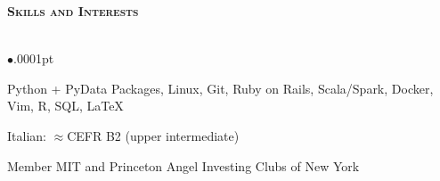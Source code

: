 \documentclass[11pt]{article}
\newcommand{\lineunder}{\vspace*{-8pt} \\ \hspace*{-18pt} \hrulefill \\}
\newcommand{\header}[1]{{\hspace*{-15pt}\vspace*{5pt} \Large \textsc{\textbf{#1}}} \vspace*{-6pt} \lineunder \vspace*{0pt} }
\newcommand{\employer}[4]{
	{\hspace*{-20pt} {\small{\textbf{\textsc{ #1}}}}
  \hfill \small{\emph{#2}}\\ ~\hspace*{-20pt} \small \emph{ #3 \hfill #4}}\\ }
\newenvironment{achievements}{\begin{list}{$\bullet$}{\topsep .0001pt \itemsep -2pt}}{\vspace*{5pt}\end{list} }
\begin{document}




\header{Skills and Interests}
	\vspace{-2pt}
	\begin{achievements}
		\item Python + PyData Packages, Linux, Git, Ruby on Rails, Scala/Spark, Docker, Vim, R, SQL, \LaTeX{}
		\item Italian: $\approx$CEFR B2 (upper intermediate)
		\item Member MIT and Princeton Angel Investing Clubs of New York
	\end{achievements}
\end{document}
